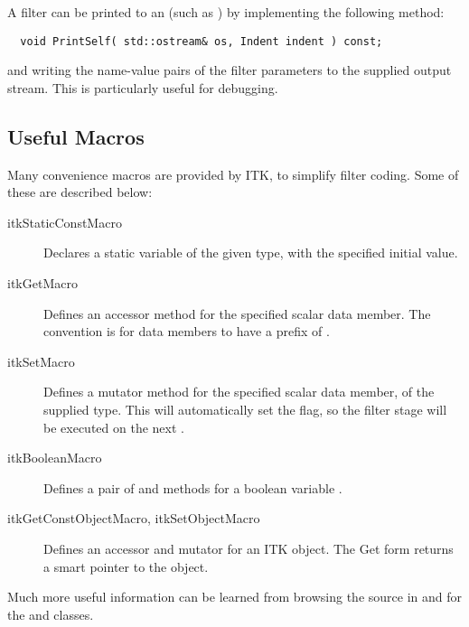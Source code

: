 A filter can be printed to an  (such as )
by implementing the following method:

\begin{verbatim}
  void PrintSelf( std::ostream& os, Indent indent ) const;
\end{verbatim}

\noindent and writing the name-value pairs of the filter parameters to the
supplied output stream.  This is particularly useful for debugging.

\subsection{Useful Macros}

Many convenience macros are provided by ITK, to simplify filter coding.
Some of these are described below:

\begin{description}
\item [itkStaticConstMacro] Declares a static variable of the given type,
  with the specified initial value.
\item [itkGetMacro] Defines an accessor method for the specified scalar data
  member.  The convention is for data members to have a prefix of
  .
\item [itkSetMacro] Defines a mutator method for the specified scalar data
  member, of the supplied type.  This will automatically set the
   flag, so the filter stage will be executed on the next
  .
\item [itkBooleanMacro] Defines a pair of  and 
  methods for a boolean variable .
\item [itkGetConstObjectMacro, itkSetObjectMacro] Defines an accessor and mutator
  for an ITK object.  The Get form returns a smart pointer to the object.
\end{description}

Much more useful information can be learned from browsing the source in
 and for the  and
 classes.



%
%



%
%
